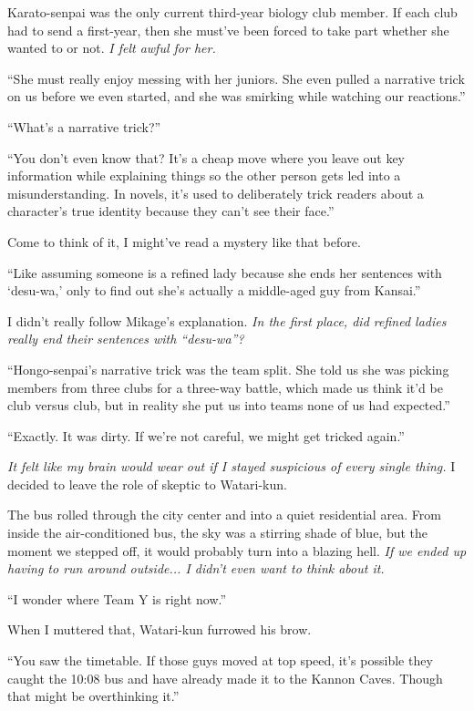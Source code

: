 \documentclass[
    a4paper,
    12pt,
    twoside,
    openany,
    UTF8,
    fontset=windows
]{ctexbook}
\begin{document}
Karato-senpai was the only current third-year biology club member. If each club had to send a first-year, then she must've been forced to take part whether she wanted to or not. \textit{I felt awful for her.}

``She must really enjoy messing with her juniors. She even pulled a narrative trick on us before we even started, and she was smirking while watching our reactions.''

``What's a narrative trick?''

``You don't even know that? It's a cheap move where you leave out key information while explaining things so the other person gets led into a misunderstanding. In novels, it's used to deliberately trick readers about a character's true identity because they can't see their face.''

Come to think of it, I might've read a mystery like that before.

``Like assuming someone is a refined lady because she ends her sentences with `desu-wa,' only to find out she's actually a middle-aged guy from Kansai.''

I didn't really follow Mikage's explanation. \textit{In the first place, did refined ladies really end their sentences with ``desu-wa''?}

``Hongo-senpai's narrative trick was the team split. She told us she was picking members from three clubs for a three-way battle, which made us think it'd be club versus club, but in reality she put us into teams none of us had expected.''

``Exactly. It was dirty. If we're not careful, we might get tricked again.''

\textit{It felt like my brain would wear out if I stayed suspicious of every single thing.} I decided to leave the role of skeptic to Watari-kun.

The bus rolled through the city center and into a quiet residential area. From inside the air-conditioned bus, the sky was a stirring shade of blue, but the moment we stepped off, it would probably turn into a blazing hell. \textit{If we ended up having to run around outside... I didn't even want to think about it.}

``I wonder where Team Y is right now.''

When I muttered that, Watari-kun furrowed his brow.

``You saw the timetable. If those guys moved at top speed, it's possible they caught the 10:08 bus and have already made it to the Kannon Caves. Though that might be overthinking it.''
\end{document}
